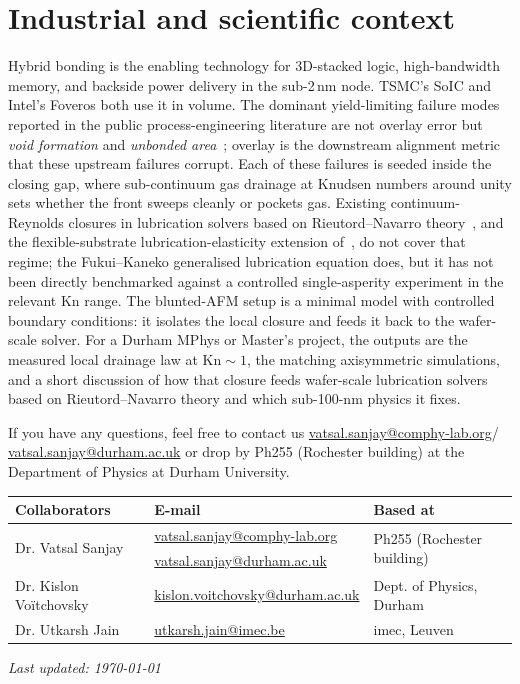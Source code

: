 \documentclass[11pt]{article}
\begin{document}
\section*{Industrial and scientific context}

Hybrid bonding is the enabling technology for 3D-stacked logic, high-bandwidth memory, and backside power delivery in the sub-2\,nm node. TSMC's SoIC and Intel's Foveros both use it in volume. The dominant yield-limiting failure modes reported in the public process-engineering literature are not overlay error but \emph{void formation} and \emph{unbonded area}~\citep{nagano2022void,sato2025factors}; overlay is the downstream alignment metric that these upstream failures corrupt. Each of these failures is seeded inside the closing gap, where sub-continuum gas drainage at Knudsen numbers around unity sets whether the front sweeps cleanly or pockets gas. Existing continuum-Reynolds closures in lubrication solvers based on Rieutord--Navarro theory~\citep{rieutord2005dynamics,navarro2013direct}, and the flexible-substrate lubrication-elasticity extension of~\citet{jain2026bond}, do not cover that regime; the Fukui--Kaneko generalised lubrication equation does, but it has not been directly benchmarked against a controlled single-asperity experiment in the relevant $\mathrm{Kn}$ range. The blunted-AFM setup is a minimal model with controlled boundary conditions: it isolates the local closure and feeds it back to the wafer-scale solver. For a Durham MPhys or Master's project, the outputs are the measured local drainage law at $\mathrm{Kn} \sim 1$, the matching axisymmetric simulations, and a short discussion of how that closure feeds wafer-scale lubrication solvers based on Rieutord--Navarro theory and which sub-100-nm physics it fixes.

If you have any questions, feel free to contact us \href{mailto:vatsal.sanjay@comphy-lab.org}{vatsal.sanjay@comphy-lab.org}/\\\href{mailto:vatsal.sanjay@durham.ac.uk}{vatsal.sanjay@durham.ac.uk} or drop by Ph255 (Rochester building) at the Department of Physics at Durham University.

\begin{center}
\begin{tabular}{|l|l|l|}
\hline \textbf{Collaborators} & \textbf{E-mail} & \textbf{Based at} \\
\hline \multirow{2}{*}{Dr. Vatsal Sanjay} & \href{mailto:vatsal.sanjay@comphy-lab.org}{vatsal.sanjay@comphy-lab.org} & \multirow{2}{*}{Ph255 (Rochester building)} \\
& \href{mailto:vatsal.sanjay@durham.ac.uk}{vatsal.sanjay@durham.ac.uk} & \\
\hline Dr. Kislon Vo\"itchovsky & \href{mailto:kislon.voitchovsky@durham.ac.uk}{kislon.voitchovsky@durham.ac.uk} & Dept. of Physics, Durham \\
\hline Dr. Utkarsh Jain & \href{mailto:utkarsh.jain@imec.be}{utkarsh.jain@imec.be} & imec, Leuven \\
\hline
\end{tabular}
\end{center}

\vspace{1em}
\noindent\textit{Last updated: \today}

\printbibliography
\end{document}

